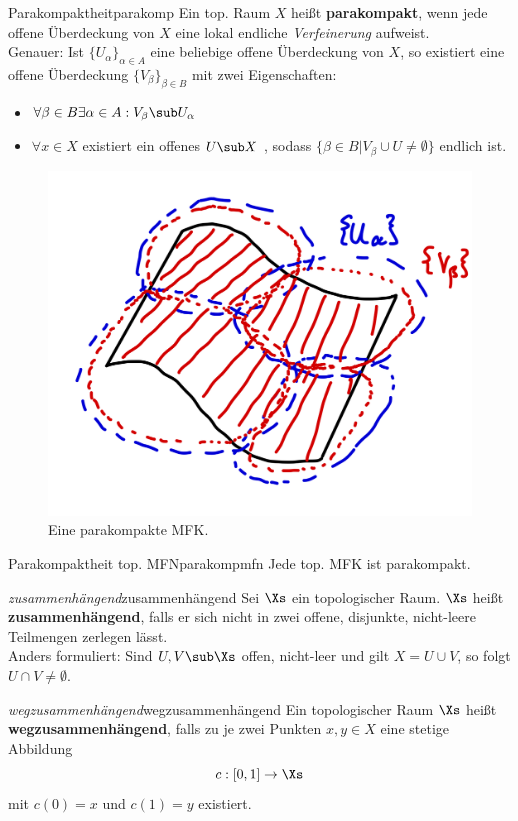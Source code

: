 \begin{definition}{Parakompaktheit}{parakomp}
Ein top. Raum $X$ heißt \textbf{parakompakt}, wenn jede offene Überdeckung von $X$ eine lokal endliche \textit{Verfeinerung} aufweist.\\
Genauer: Ist $\{U_\alpha\}_{\alpha \in A}$ eine beliebige offene Überdeckung von $X$, so existiert eine offene Überdeckung $\{V_\beta \}_{\beta \in B}$ mit zwei Eigenschaften:
\begin{itemize}
\item $\forall \beta \in B \exists \alpha \in A: V_\beta \sub U_\alpha$
\item $\forall x \in X$ existiert ein offenes $U \sub X$ , sodass $\{ \beta \in B | V_\beta \cup U \neq \emptyset \}$ endlich ist.
\end{itemize}
\begin{figure}[H]
\label{fig:parakomp}
\centering
\includegraphics[width=0.2\linewidth]{Bilder/parakompakt.png}
\caption{Eine parakompakte MFK.}
\end{figure}
\end{definition}
\begin{satz}{Parakompaktheit top. MFN}{parakompmfn}
Jede top. MFK ist parakompakt.
\end{satz}
\begin{definition}{\textit{zusammenhängend}}{zusammenhängend}
Sei $\Xs$ ein topologischer Raum. $\Xs$ heißt \textbf{zusammenhängend}, falls er sich nicht in zwei offene, disjunkte, nicht-leere Teilmengen zerlegen lässt.\\
Anders formuliert: Sind $U,V \sub \Xs$ offen, nicht-leer und gilt $X = U \cup V$, so folgt $U \cap V \neq \emptyset$.
\end{definition}
\begin{definition}{\textit{wegzusammenhängend}}{wegzusammenhängend}
Ein topologischer Raum $\Xs$ heißt \textbf{wegzusammenhängend}, falls zu je zwei Punkten $x,y \in X$ eine stetige Abbildung
\begin{equation}
c: [0,1] \to \Xs
\end{equation}
mit $c(0)=x$ und $c(1)=y$ existiert.
\end{definition}
